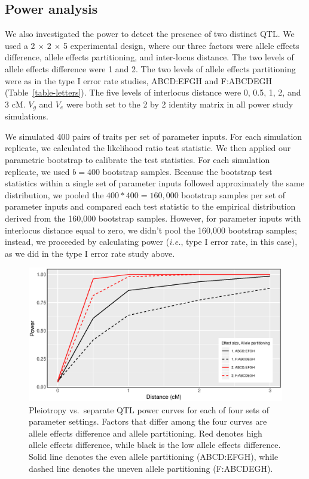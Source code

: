 \documentclass[12pt,twoside, lineno]{gsajnl}
\begin{document}
\subsection{Power analysis}

We also investigated the power to detect the presence of two
distinct QTL. We used a 2 $\times$ 2 $\times$ 5 experimental design, where our
three factors were allele effects difference, allele effects
partitioning, and inter-locus distance. The two levels of allele
effects difference were 1 and 2. The two levels of allele effects
partitioning were as in the type I error rate studies, ABCD:EFGH and
F:ABCDEGH (Table~\ref{table-letters}). The five levels of interlocus
distance were 0, 0.5, 1, 2, and 3 cM. $V_g$ and $V_e$ were both set to
the 2 by 2 identity matrix in all power study simulations.

We simulated 400 pairs of traits per set of parameter inputs. For
each simulation replicate, we calculated the likelihood ratio test
statistic. We then applied our parametric bootstrap to calibrate the
test statistics. For each simulation replicate, we used $b = 400$ bootstrap
samples. Because the bootstrap test statistics within a single set of
parameter inputs followed approximately the same distribution, we
pooled the $400 * 400 = 160,000$ bootstrap samples per set of
parameter inputs and compared each test statistic to the empirical
distribution derived from the 160,000 bootstrap samples. However, for
parameter inputs with interlocus distance equal to zero, we didn't
pool the 160,000 bootstrap samples; instead, we proceeded by
calculating power (\textit{i.e.}, type I error rate, in this case), as we did in the
type I error rate study above.

\begin{figure}
\includegraphics[width = \textwidth]{../R/power-curves.eps}
\caption{Pleiotropy vs.\ separate QTL power curves for each of four
  sets of parameter settings. Factors that differ among the four
  curves are allele effects difference and allele partitioning. Red denotes high allele effects difference, while black is the low allele effects difference. Solid line denotes the even allele partitioning (ABCD:EFGH), while dashed line denotes the uneven allele partitioning (F:ABCDEGH).}
\label{fig:power}
\end{figure}
\end{document}
